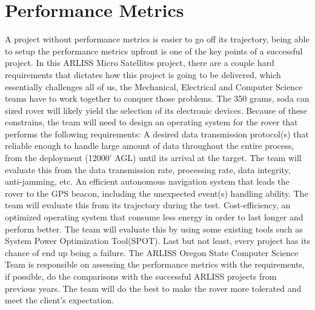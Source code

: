 \documentclass[10pt,onecolumn,draftclsnofoot,journal]{IEEEtran}
\begin{document}
\section*{\textbf{Performance Metrics}}
\noindent A project without performance metrics is easier to go off its trajectory, being able to setup the performance metrics upfront is one of the key points of a successful project. In this ARLISS Micro Satellites project, there are a couple hard requirements that dictates how this project is going to be delivered, which essentially challenges all of us, the Mechanical, Electrical and Computer Science teams have to work together to conquer those problems.
The 350 grams, soda can sized rover will likely yield the selection of its electronic devices. Because of these constrains, the team will need to design an operating system for the rover that performs the following requirements:
A desired data transmission protocol(s) that reliable enough to handle large amount of data throughout the entire process, from the deployment (12000’ AGL) until its arrival at the target. The team will evaluate this from the data transmission rate, processing rate, data integrity, anti-jamming, etc.
An efficient autonomous navigation system that leads the rover to the GPS beacon, including the unexpected event(s) handling ability. The team will evaluate this from its trajectory during the test.
Cost-efficiency, an optimized operating system that consume less energy in order to last longer and perform better. The team will evaluate this by using some existing tools such as System Power Optimization Tool(SPOT).
Last but not least, every project has its chance of end up being a failure. The ARLISS Oregon State Computer Science Team is responsible on assessing the performance metrics with the requirements, if possible, do the comparisons with the successful ARLISS projects from previous years. The team will do the best to make the rover more tolerated and meet the client’s expectation. 
\end{document}
